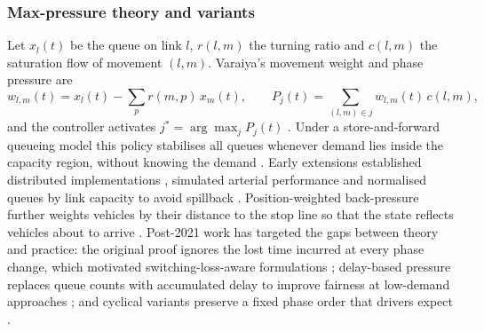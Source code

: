 \subsubsection{Max-pressure theory and variants}
Let $x_l(t)$ be the queue on link $l$, $r(l,m)$ the turning ratio and $c(l,m)$ the saturation flow of movement
$(l,m)$. Varaiya's movement weight and phase pressure are
\begin{equation}
  w_{l,m}(t) = x_l(t) - \sum_{p} r(m,p)\,x_m(t), \qquad
  P_j(t) = \sum_{(l,m)\in j} w_{l,m}(t)\,c(l,m),
  \label{eq:lit-mp}
\end{equation}
and the controller activates $j^\ast=\arg\max_j P_j(t)$ \cite{varaiya2013maxpressure}. Under a store-and-forward
queueing model this policy stabilises all queues whenever demand lies inside the capacity region, without
knowing the demand \cite{varaiya2013maxpressure,tassiulas1992}. Early extensions established distributed
implementations \cite{wongpiromsarn2012distributed}, simulated arterial performance \cite{kouvelas2014maxpressure}
and normalised queues by link capacity to avoid spillback \cite{gregoire2015capacity}. Position-weighted
back-pressure further weights vehicles by their distance to the stop line so that the state reflects vehicles
about to arrive \cite{li2019position}. Post-2021 work has targeted the gaps between theory and practice: the
original proof ignores the lost time incurred at every phase change, which motivated switching-loss-aware
formulations \cite{wang2022learning}; delay-based pressure replaces queue counts with accumulated delay to improve
fairness at low-demand approaches \cite{liu2022novel}; and cyclical variants preserve a fixed phase order that
drivers expect \cite{levin2023maxpressure,barman2022performance}.

